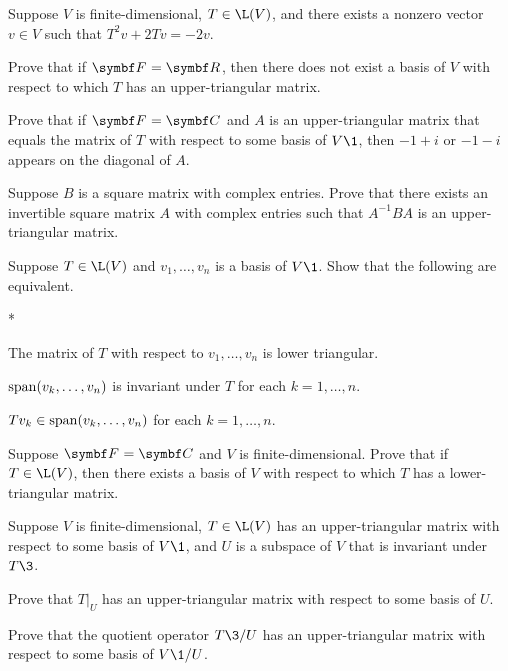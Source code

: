 \begin{exercises}
\exercise
Suppose $V$ is finite-dimensional, $T \in \L(V)$, and there exists a nonzero vector $v \in V$ such that
$T^2 v + 2Tv = -2v$.
\begin{subtheorem}
\item
Prove that if $\F{} = \R{}$, then there does not exist a basis of $V$ with respect to which $T$ has an upper-triangular matrix.
\item
Prove that if $\F{} = \C{}$ and $A$ is an upper-triangular matrix that equals the matrix of $T$ with respect to some basis of $V\1$, then $-1 + i$ or $-1 - i$ appears on the diagonal of $A$.
\end{subtheorem}
\exercisesubtheoremend


\exercise
Suppose $B$ is a square matrix with complex entries. Prove that there exists an
invertible square matrix $A$ with complex entries such that $A^{-1} B A$ is an
upper-triangular matrix.


\exercise
Suppose $T \in \L(V)$ and $v_1, \dots, v_n$ is a basis of $V\1$. Show that the following are equivalent.\label{5lower}
\begin{subtheorem}*
\item
The matrix of $T$ with respect to $v_1, \dots, v_n$ is lower triangular.
\item
$\operatorname{span}(v_k, \dots, v_n)$ is invariant under $T$ for each $k = 1, \dots, n$.
\item
$Tv_k \in \operatorname{span}(v_k, \dots, v_n)$ for each $k = 1, \dots, n$.
\end{subtheorem}


\exercise
Suppose $\F{} = \C{}$ and $V$ is finite-dimensional. Prove that if $T \in \L(V)$, then there exists a basis of $V$ with respect to which $T$ has a lower-triangular matrix.


\exercise
Suppose $V$ is finite-dimensional, $T \in \L(V)$ has an upper-triangular matrix with respect to some basis of $V\1$, and $U$ is a subspace of $V$ that is invariant under $T\3$.
\begin{subtheorem}
\item
Prove that $T|_U$ has an upper-triangular matrix with respect to some basis of $U$.
\item
Prove that the quotient operator $T\3/U$ has an upper-triangular matrix with respect to some basis of $V\1/U$.
\end{subtheorem}



\end{exercises}
